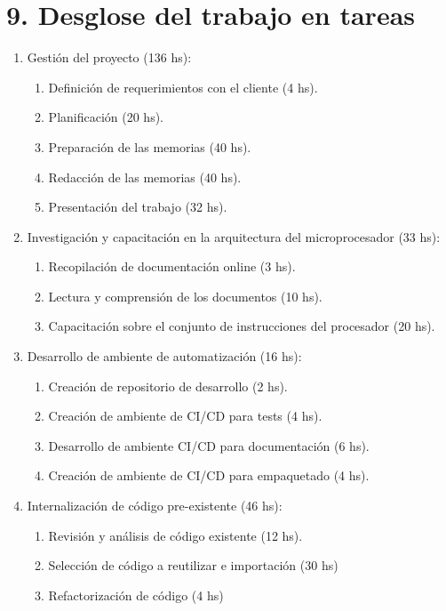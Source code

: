 \section{9. Desglose del trabajo en tareas}
\label{sec:9-desglose-del-trabajo-en-tareas}


\begin{enumerate}
\item Gestión del proyecto (136 hs):

  \begin{enumerate}
  \item Definición de requerimientos con el cliente (4 hs).
  \item Planificación (20 hs).
  \item Preparación de las memorias (40 hs).
  \item Redacción de las memorias (40 hs).
  \item Presentación del trabajo (32 hs).
  \end{enumerate}

\item Investigación y capacitación en la arquitectura del microprocesador (33 hs):

  \begin{enumerate}
  \item Recopilación de documentación online (3 hs).
  \item Lectura y comprensión de los documentos (10 hs).
  \item Capacitación sobre el conjunto de instrucciones del procesador (20 hs).
  \end{enumerate}

\item Desarrollo de ambiente de automatización (16 hs):

  \begin{enumerate}
  \item Creación de repositorio de desarrollo (2 hs).
  \item Creación de ambiente de CI/CD para tests (4 hs).
  \item Desarrollo  de ambiente CI/CD para documentación (6 hs).
  \item Creación de ambiente de CI/CD para empaquetado (4 hs).
  \end{enumerate}

\item Internalización de código pre-existente (46 hs):

  \begin{enumerate}
  \item Revisión y análisis de código existente (12 hs).
  \item Selección de código a reutilizar e importación (30 hs)
  \item Refactorización de código (4 hs)
  \end{enumerate}


\end{enumerate}
